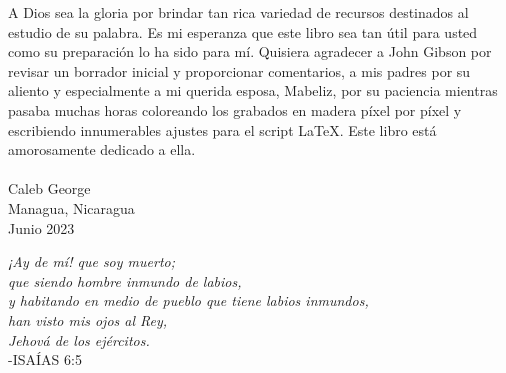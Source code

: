 A Dios sea la gloria por brindar tan rica variedad de recursos destinados al estudio de su palabra. Es mi esperanza que este libro sea tan útil para usted como su preparación lo ha sido para mí. Quisiera agradecer a John Gibson por revisar un borrador inicial y proporcionar comentarios, a mis padres por su aliento y especialmente a mi querida esposa, Mabeliz, por su paciencia mientras pasaba muchas horas coloreando los grabados en madera píxel por píxel y escribiendo innumerables ajustes para el script \LaTeX{}. Este libro está amorosamente dedicado a ella.\\
\\
Caleb George\\
Managua, Nicaragua\\
Junio 2023
\clearpage

\cleartorecto
\begin{vplace}
\begin{center}
\textit{
¡Ay de mí! que soy muerto; \\
que siendo hombre inmundo de labios, \\
y habitando en medio de pueblo que tiene labios inmundos, \\
han visto mis ojos al Rey, \\
Jehová de los ejércitos.} \\
-ISAÍAS 6:5
\end{center}
\end{vplace}

\ClearShipoutPicture